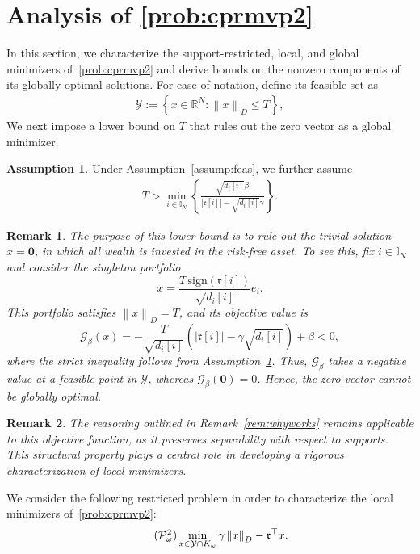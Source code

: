 \documentclass[11pt]{article}
\theoremstyle{plain}
\theoremstyle{definition}
\newtheorem{assumption}{Assumption}
\theoremstyle{plain}
\newtheorem{remark}{Remark}
\newcommand{\RR}{{\mathbb R}} %
\newcommand{\II}{{\mathbb I}}
\newcommand{\norm}[1]{\left\lVert#1\right\rVert}
\newcommand{\abs}[1]{\left\lvert#1\right\rvert}
\newcommand{\tpose}[1]{#1^{\top}}
\newcommand{\cG}{{\mathcal G}}
\newcommand{\cP}{{\mathcal P}}
\newcommand{\ccr}{{\mathfrak r}}
\newcommand{\cY}{{\mathcal Y}}
\begin{document}
\section{Analysis of \texorpdfstring{\eqref{prob:cprmvp2}}{P2}}\label{theory2}
In this section, we characterize the support-restricted, local, and global minimizers of~\eqref{prob:cprmvp2} and derive bounds on the nonzero components of its globally optimal solutions. For ease of notation, define its feasible set as
\begin{align}
\cY:=\left\{x\in\RR^N:\norm{x}_D \leq T\right\},\label{eq:cY}
\end{align}
We next impose a lower bound on $T$ that rules out the zero vector as a global
minimizer.
\begin{assumption}\label{assum:feas2}
    Under Assumption~\ref{assump:feas}, we further assume
    \begin{align*}
        T>\min_{i\in\II_N}\left\{\frac{\sqrt{d_i[i]}\beta}{\abs{\ccr[i]}-\sqrt{d_i[i]}\gamma}\right\}.
    \end{align*}
\end{assumption}
\begin{remark}
    The purpose of this lower bound is to rule out the trivial solution $x=\mathbf{0}$, in which all wealth is invested in the risk-free asset. To see this, fix $i\in\II_N$ and consider the singleton portfolio
    \[
    x=\frac{T\,\mathrm{sign}(\ccr[i])}{\sqrt{d_i[i]}}e_i.
    \]
    This portfolio satisfies $\norm{x}_D=T$, and its objective value is
    \[
    \cG_\beta(x)
    =
    -\frac{T}{\sqrt{d_i[i]}}
    \left(\abs{\ccr[i]}-\gamma\sqrt{d_i[i]}\right)+\beta <0,
    \]
    where the strict inequality follows from Assumption~\ref{assum:feas2}. Thus, $\cG_\beta$ takes a negative value at a feasible point in $\cY$, whereas $\cG_\beta(\mathbf{0})=0$. Hence, the zero vector cannot be globally optimal.
\end{remark}

\begin{remark}The reasoning outlined in Remark~\ref{rem:whyworks} remains applicable to this objective function, as it preserves separability with respect to supports. This structural property plays a central role in developing a rigorous characterization of local minimizers.
\end{remark}
We consider the following restricted problem in order to characterize the local minimizers of~\eqref{prob:cprmvp2}:
\begin{align}\tag{$\cP^2_\omega$}\label{prob:mvp2-omega}
\min_{x\in \cY\cap K_\omega}\gamma\norm{x}_D-\tpose{\ccr}x.
\end{align}
\end{document}
